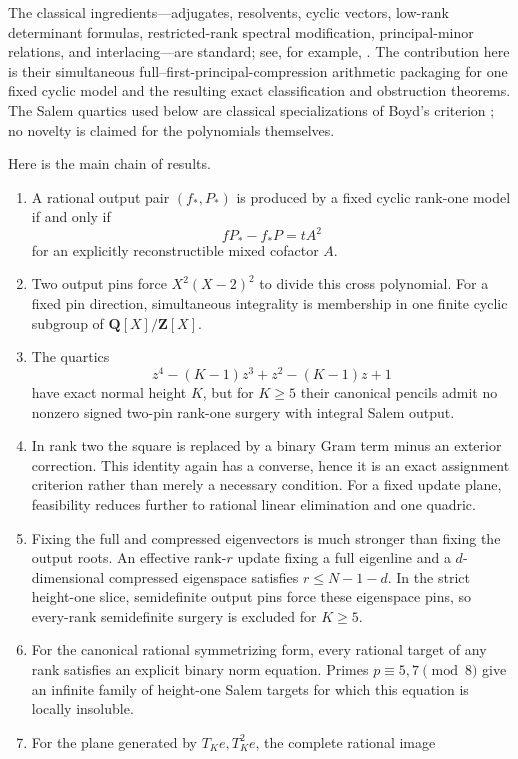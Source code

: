 \documentclass[11pt,reqno]{amsart}
\theoremstyle{definition}
\theoremstyle{remark}
\newcommand{\Q}{\mathbf Q}
\newcommand{\Z}{\mathbf Z}
\begin{document}
The classical ingredients---adjugates, resolvents, cyclic vectors, low-rank
determinant formulas, restricted-rank spectral modification, principal-minor
relations, and interlacing---are standard; see, for example,
\cite{dptz,merzel,merzelm,kula,arbenzgangergolub,
alahmadiehvinzant,delrio}.  The contribution here is their simultaneous
full--first-principal-compression arithmetic packaging for one fixed cyclic
model and the resulting exact classification and obstruction theorems.  The
Salem quartics used below are classical specializations of Boyd's criterion
\cite{boydquartic,zaimi}; no novelty is claimed for the polynomials
themselves.

Here is the main chain of results.

\begin{enumerate}[label=\textup{(\roman*)}]
\item A rational output pair $(f_*,P_*)$ is produced by a fixed cyclic
rank-one model if and only if
\[
 fP_*-f_*P=tA^2
\]
for an explicitly reconstructible mixed cofactor $A$.
\item Two output pins force $X^2(X-2)^2$ to divide this cross polynomial.
For a fixed pin direction, simultaneous integrality is membership in one
finite cyclic subgroup of $\Q[X]/\Z[X]$.
\item The quartics
\[
 z^4-(K-1)z^3+z^2-(K-1)z+1
\]
have exact normal height $K$, but for $K\geq5$ their canonical pencils admit
no nonzero signed two-pin rank-one surgery with integral Salem output.
\item In rank two the square is replaced by a binary Gram term minus an
exterior correction.  This identity again has a converse, hence it is an
exact assignment criterion rather than merely a necessary condition.
For a fixed update plane, feasibility reduces further to rational linear
elimination and one quadric.
\item Fixing the full and compressed eigenvectors is much stronger than
fixing the output roots.  An effective rank-$r$ update fixing a full
eigenline and a $d$-dimensional compressed eigenspace satisfies
$r\leq N-1-d$.  In the strict height-one slice, semidefinite output pins force
these eigenspace pins, so every-rank semidefinite surgery is excluded for
$K\geq5$.
\item For the canonical rational symmetrizing form, every rational target of
any rank satisfies an explicit binary norm equation.  Primes
$p\equiv5,7\pmod8$ give an infinite family of height-one Salem targets for
which this equation is locally insoluble.
\item For the plane generated by $T_Ke,T_K^2e$, the complete rational image

\end{enumerate}
\end{document}
